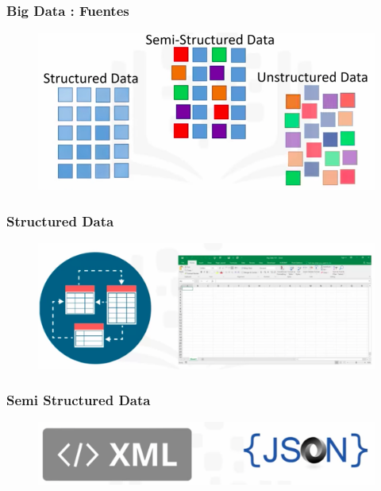 \documentclass{beamer}
\begin{document}
\begin{frame}
\frametitle{Big Data : Fuentes}
\begin{figure}
\includegraphics[scale=0.3]{img/2_BigData_DataSources}
\end{figure}
\end{frame}


\begin{frame}
\frametitle{Structured Data}
\begin{figure}
\includegraphics[scale=0.25]{img/2_Structured_Data}
\end{figure}
\end{frame}

\begin{frame}
\frametitle{Semi Structured Data}
\begin{figure}
\includegraphics[scale=0.25]{img/2_Semi_Structured_Data}
\end{figure}
\end{frame}
\end{document}
